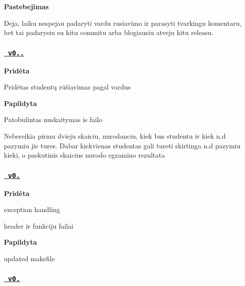 {\bfseries{Pastebejimas}}

Deja, laiku nespejau padaryti vardu rusiavimo ir parasyti tvarkingu komentaru, bet tai padarysiu su kitu commitu arba blogiausiu atveju kitu releas\textquotesingle{}u.

\subsubsection*{\href{https://github.com/simassimonas/ObjProg-2uzd/releases/tag/v0.2.1}{\texttt{ v0..}}}

{\bfseries{Pridėta}}
\begin{DoxyItemize}
\item Pridėtas studentų rūšiavimas pagal vardus
\end{DoxyItemize}

{\bfseries{Papildyta}}
\begin{DoxyItemize}
\item Patobulintas nuskaitymas is failo
\end{DoxyItemize}

Nebereikia pirmu dvieju skaiciu, nurodanciu, kiek bus studentu ir kiek n.\+d pazymiu jie tures. Dabar kiekvienas studentas gali tureti skirtinga n.\+d pazymiu kieki, o paskutinis skaicius nurodo egzamino rezultata


\begin{DoxyCode}{0}
\end{DoxyCode}
 \subsubsection*{\href{https://github.com/simassimonas/ObjProg-2uzd/releases/tag/v0.3}{\texttt{ v0.}}}

{\bfseries{Pridėta}}
\begin{DoxyItemize}
\item exception handling
\item header ir funkciju failai
\end{DoxyItemize}

{\bfseries{Papildyta}}
\begin{DoxyItemize}
\item updated makefile
\end{DoxyItemize}

\subsubsection*{\href{https://github.com/simassimonas/ObjProg-2uzd/releases/tag/v0.4}{\texttt{ v0.}}}

